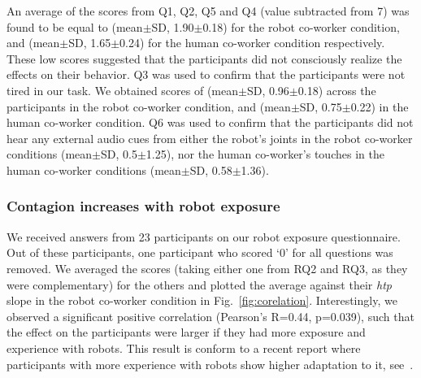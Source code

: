 An average of the scores from Q1, Q2, Q5 and Q4 (value subtracted from 7) was found to be equal to (mean$\pm$SD, 1.90$\pm$0.18) for the robot co-worker condition, and (mean$\pm$SD, 1.65$\pm$0.24) for the human co-worker condition respectively. These low scores suggested that the participants did not consciously realize the effects on their behavior. Q3 was used to confirm that the participants were not tired in our task. We obtained scores of (mean$\pm$SD, 0.96$\pm$0.18) across the participants in the robot co-worker condition, and (mean$\pm$SD, 0.75$\pm$0.22) in the human co-worker condition. Q6 was used to confirm that the participants did not hear any external audio cues from either the robot's joints in the robot co-worker conditions (mean$\pm$SD, 0.5$\pm$1.25), nor the human co-worker's touches in the human co-worker conditions (mean$\pm$SD, 0.58$\pm$1.36).

\subsubsection{Contagion increases with robot exposure}

We received answers from 23 participants on our robot exposure questionnaire. Out of these participants, one participant who scored `0' for all questions was removed. We averaged the scores (taking either one from RQ2 and RQ3, as they were complementary) for the others and plotted the average against their {\it htp} slope in the robot co-worker condition in Fig.~\ref{fig:corelation}. Interestingly, we observed a significant positive correlation (Pearson's R=0.44, p=0.039), such that the effect on the participants were larger if they had more exposure and experience with robots. This result is conform to a recent report where participants with more experience with robots show higher adaptation to it, see~\cite{vannucci:roman:2017}.



